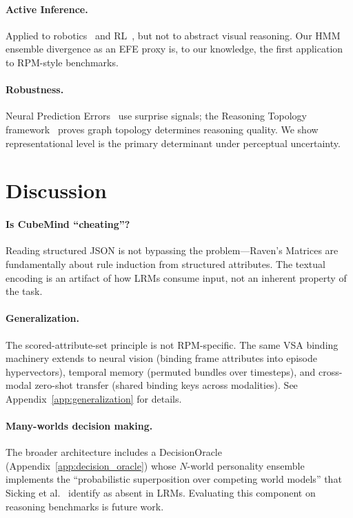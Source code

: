 \documentclass{article}
\begin{document}
\paragraph{Active Inference.}
Applied to robotics~\cite{world_models_robotics2023} and RL~\cite{deep_active_inference2026}, but not to abstract visual reasoning. Our HMM ensemble divergence as an EFE proxy is, to our knowledge, the first application to RPM-style benchmarks.

\paragraph{Robustness.}
Neural Prediction Errors~\cite{neural_prediction2026} use surprise signals; the Reasoning Topology framework~\cite{huang2026reasoning} proves graph topology determines reasoning quality. We show representational level is the primary determinant under perceptual uncertainty.

\section{Discussion}

\paragraph{Is CubeMind ``cheating''?}
Reading structured JSON is not bypassing the problem---Raven's Matrices are fundamentally about rule induction from structured attributes. The textual encoding is an artifact of how LRMs consume input, not an inherent property of the task.

\paragraph{Generalization.}
The scored-attribute-set principle is not RPM-specific. The same VSA binding machinery extends to neural vision (binding frame attributes into episode hypervectors), temporal memory (permuted bundles over timesteps), and cross-modal zero-shot transfer (shared binding keys across modalities). See Appendix~\ref{app:generalization} for details.

\paragraph{Many-worlds decision making.}
The broader architecture includes a DecisionOracle (Appendix~\ref{app:decision_oracle}) whose $N$-world personality ensemble implements the ``probabilistic superposition over competing world models'' that Sicking et al.~\cite{sicking2026iravenx} identify as absent in LRMs. Evaluating this component on reasoning benchmarks is future work.
\end{document}
